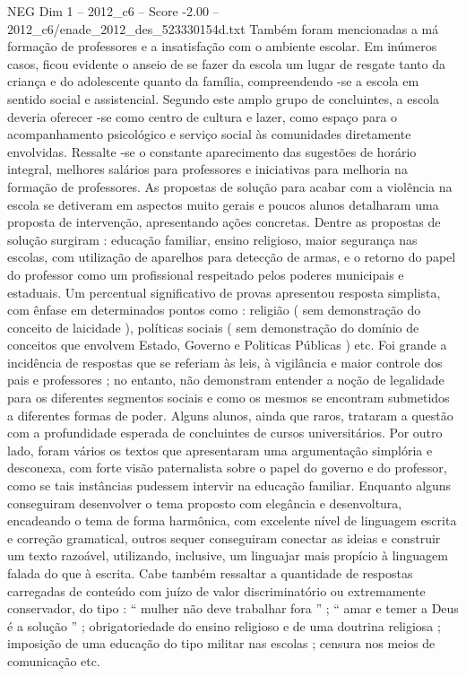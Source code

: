 \begin{textsample}{NEG Dim 1 – 2012\_c6 – Score -2.00 – 2012\_c6/enade\_2012\_des\_523330154d.txt}
Também foram mencionadas a má formação de professores e a insatisfação com o ambiente escolar.
Em inúmeros casos, ficou evidente o anseio de se fazer da escola um lugar de resgate tanto da criança e do adolescente quanto da família, compreendendo -se a escola em sentido social e assistencial.
Segundo este amplo grupo de concluintes, a escola deveria oferecer -se como centro de cultura e lazer, como espaço para o acompanhamento psicológico e serviço social às comunidades diretamente envolvidas.
Ressalte -se o constante aparecimento das sugestões de horário integral, melhores salários para professores e iniciativas para melhoria na formação de professores.
As propostas de solução para acabar com a violência na escola se detiveram em aspectos muito gerais e poucos alunos detalharam uma proposta de intervenção, apresentando ações concretas.
Dentre as propostas de solução surgiram : educação familiar, ensino religioso, maior segurança nas escolas, com utilização de aparelhos para detecção de armas, e o retorno do papel do professor como um profissional respeitado pelos poderes municipais e estaduais.
Um percentual significativo de provas apresentou resposta simplista, com ênfase em determinados pontos como : religião ( sem demonstração do conceito de laicidade ), políticas sociais ( sem demonstração do domínio de conceitos que envolvem Estado, Governo e Politicas Públicas ) etc.
Foi grande a incidência de respostas que se referiam às leis, à vigilância e maior controle dos pais e professores ; no entanto, não demonstram entender a noção de legalidade para os diferentes segmentos sociais e como os mesmos se encontram submetidos a diferentes formas de poder.
Alguns alunos, ainda que raros, trataram a questão com a profundidade esperada de concluintes de cursos universitários.
Por outro lado, foram vários os textos que apresentaram uma argumentação simplória e desconexa, com forte visão paternalista sobre o papel do governo e do professor, como se tais instâncias pudessem intervir na educação familiar.
Enquanto alguns conseguiram desenvolver o tema proposto com elegância e desenvoltura, encadeando o tema de forma harmônica, com excelente nível de linguagem escrita e correção gramatical, outros sequer conseguiram conectar as ideias e construir um texto razoável, utilizando, inclusive, um linguajar mais propício à linguagem falada do que à escrita.
Cabe também ressaltar a quantidade de respostas carregadas de conteúdo com juízo de valor discriminatório ou extremamente conservador, do tipo : “ mulher não deve trabalhar fora ” ; “ amar e temer a Deus é a solução ” ; obrigatoriedade do ensino religioso e de uma doutrina religiosa ; imposição de uma educação do tipo militar nas escolas ; censura nos meios de comunicação etc.

\end{textsample}
